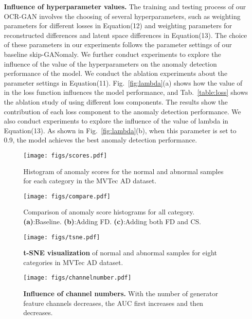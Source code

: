 \documentclass[lettersize,journal]{IEEEtran}
\begin{document}
\noindent\textbf{Influence of hyperparameter values.} 
The training and testing process of our OCR-GAN involves the choosing of several hyperparameters, such as weighting parameters for different losses in Equation(12) and weighting parameters for reconstructed differences and latent space differences in Equation(13). The choice of these parameters in our experiments follows the parameter settings of our baseline skip-GANomaly. We further conduct experiments to explore the influence of the value of the hyperparameters on the anomaly detection performance of the model.
We conduct the ablation experiments about the parameter settings in Equation(11). Fig.~\ref{fig:lambda}(a) shows how the value of  in the loss function influences the model performance, and Tab.~\ref{table:loss} shows the ablation study of using different loss components. The results show the contribution of each loss component to the anomaly detection performance.
We also conduct experiments to explore the influence of the value of lambda in Equation(13). As shown in Fig.~\ref{fig:lambda}(b), when this parameter is set to 0.9, the model achieves the best anomaly detection performance. 



\begin{figure*}[t]
    \centering
    \texttt{[image: figs/scores.pdf]} 
    \caption{Histogram of anomaly scores for the normal and abnormal samples for each category in the MVTec AD dataset.}
    \label{fig:scores}
\end{figure*}
\begin{figure*}[t]
	\centering
	\texttt{[image: figs/compare.pdf]}
	\caption{Comparison of anomaly score histograms for all category. \textbf{(a)}:Baseline. \textbf{(b)}:Adding FD. \textbf{(c)}:Adding both FD and CS.}
	\label{fig:com_score}
\end{figure*}

\begin{figure*}[tp]
	\centering
	\texttt{[image: figs/tsne.pdf]}
	\caption{\textbf{t-SNE visualization} of normal and abnormal samples for eight categories in MVTec AD dataset.}
	\label{fig:tsne}
\end{figure*}

\begin{figure}[t]
	\centering
	\texttt{[image: figs/channelnumber.pdf]}
	\caption{\textbf{Influence of channel numbers.} With the number of generator feature channels decreases, the AUC first increases and then decreases.}
	\label{fig:channel}
\end{figure}
\end{document}
